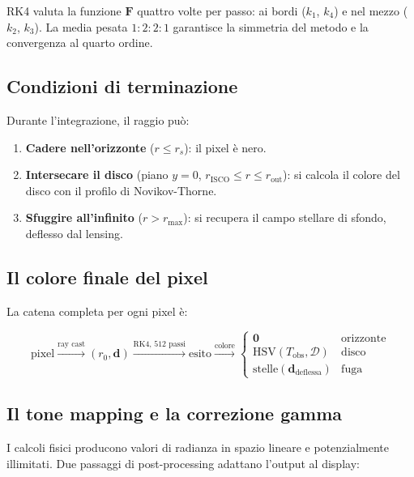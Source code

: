 \documentclass[12pt, a4paper, twoside]{article}
\theoremstyle{definition}
\newcommand{\RS}{r_{\!s}}          %
\newcommand{\Risco}{r_{\!\text{ISCO}}} %
\begin{document}
RK4 valuta la funzione $\mathbf{F}$ quattro volte per passo: ai bordi ($k_1$,
$k_4$) e nel mezzo ($k_2$, $k_3$). La media pesata $1{:}2{:}2{:}1$ garantisce
la simmetria del metodo e la convergenza al quarto ordine.

\subsection{Condizioni di terminazione}

Durante l'integrazione, il raggio può:

\begin{enumerate}
  \item \textbf{Cadere nell'orizzonte} ($r \leq \RS$): il pixel è nero.
  \item \textbf{Intersecare il disco} (piano $y=0$, $\Risco \leq r \leq r_{\text{out}}$):
        si calcola il colore del disco con il profilo di Novikov-Thorne.
  \item \textbf{Sfuggire all'infinito} ($r > r_{\max}$): si recupera il
        campo stellare di sfondo, deflesso dal lensing.
\end{enumerate}

\subsection{Il colore finale del pixel}

La catena completa per ogni pixel è:

\begin{equation}
  \text{pixel} \xrightarrow{\text{ray cast}}
  (r_0, \mathbf{d}) \xrightarrow{\text{RK4, 512 passi}}
  \text{esito} \xrightarrow{\text{colore}}
  \begin{cases}
    \mathbf{0} & \text{orizzonte}\\
    \text{HSV}(T_{\text{obs}}, \mathcal{D}) & \text{disco}\\
    \text{stelle}(\mathbf{d}_{\text{deflessa}}) & \text{fuga}
  \end{cases}
\end{equation}

\subsection{Il tone mapping e la correzione gamma}

I calcoli fisici producono valori di radianza in spazio lineare e potenzialmente
illimitati. Due passaggi di post-processing adattano l'output al display:
\end{document}
